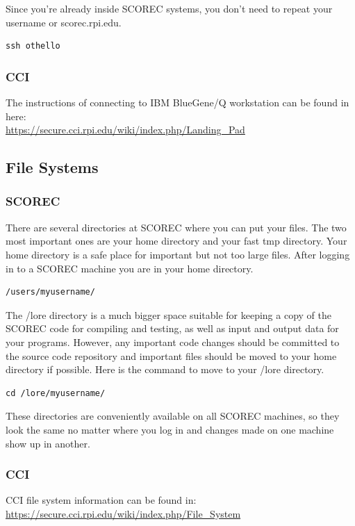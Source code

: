 \documentclass{article}
\begin{document}
Since you're already inside SCOREC systems, you don't need to repeat your username or scorec.rpi.edu.

\begin{lstlisting}
ssh othello
\end{lstlisting}

\subsubsection{CCI}
The instructions of connecting to IBM BlueGene/Q workstation can be found in here: \\
\url{https://secure.cci.rpi.edu/wiki/index.php/Landing_Pad}

\subsection{File Systems}
\label{ch:1.2}
\subsubsection{SCOREC}
There are several directories at SCOREC where you can put your files. The two most important ones are your home directory and your fast tmp directory. Your home directory is a safe place for important but not too large files. After logging in to a SCOREC machine you are in your home directory.
\begin{lstlisting}
/users/myusername/
\end{lstlisting}
The /lore directory is a much bigger space suitable for keeping a copy of the SCOREC code for compiling and testing, as well as input and output data for your programs. However, any important code changes should be committed to the source code repository and important files should be moved to your home directory if possible. Here is the command to move to your /lore directory.
\begin{lstlisting}
cd /lore/myusername/
\end{lstlisting}

These directories are conveniently available on all SCOREC machines, so they look the same no matter where you log in and changes made on one machine show up in another.

\subsubsection{CCI}
CCI file system information can be found in:\\
\url{https://secure.cci.rpi.edu/wiki/index.php/File\_System}
\end{document}
